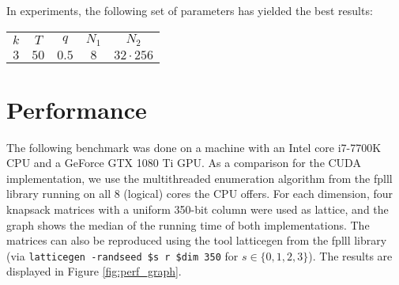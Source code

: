 \documentclass{scrartcl}
\begin{document}
    In experiments, the following set of parameters has yielded the best results:
    
    \begin{center}
        \begin{tabular}[5]{c c c c c}
            $k$ & $T$ & $q$ & $N_1$ & $N_2$ \\
            $3$ & $50$ & $0.5$ & $8$ & $32 \cdot 256$
        \end{tabular}
    \end{center}

    \section{Performance}


    The following benchmark was done on a machine with an Intel core i7-7700K CPU and a GeForce GTX 1080 Ti GPU. As a comparison for the CUDA implementation, we use the multithreaded enumeration algorithm from the fplll library \cite{fplll} running on all 8 (logical) cores the CPU offers.
    For each dimension, four knapsack matrices with a uniform 350-bit column were used as lattice, and the graph shows the median of the running time of both implementations. The matrices can also be reproduced using the tool latticegen from the fplll library (via \texttt{latticegen -randseed \$s r \$dim 350} for $s \in \{0, 1, 2, 3\}$).
    The results are displayed in Figure \ref{fig:perf_graph}.
\end{document}
